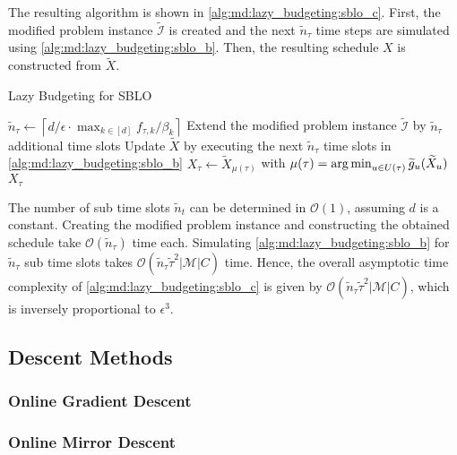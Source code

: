 The resulting algorithm is shown in \autoref{alg:md:lazy_budgeting:sblo_c}. First, the modified problem instance $\widetilde{\mathcal{I}}$ is created and the next $\widetilde{n}_{\tau}$ time steps are simulated using \autoref{alg:md:lazy_budgeting:sblo_b}. Then, the resulting schedule $X$ is constructed from $\widetilde{X}$.

\begin{algorithm}
    \caption{Lazy Budgeting for SBLO \cite{Albers2021_2}}\label{alg:md:lazy_budgeting:sblo_c}
    $\widetilde{n}_{\tau} \gets \left\lceil d / \epsilon \cdot \max_{k \in [d]} f_{\tau,k} / \beta_k\right\rceil$\;
    Extend the modified problem instance $\widetilde{\mathcal{I}}$ by $\widetilde{n}_{\tau}$ additional time slots\;
    Update $\widetilde{X}$ by executing the next $\widetilde{n}_{\tau}$ time slots in \autoref{alg:md:lazy_budgeting:sblo_b}\;
    $X_{\tau} \gets \widetilde{X}_{\mu(\tau)}$ with $\mu(\tau) = \operatorname*{arg\,min}_{u \in U(\tau)} \widetilde{g}_u(\widetilde{X}_u)$\;
    \Return $X_{\tau}$\;
\end{algorithm}

The number of sub time slots $\widetilde{n}_t$ can be determined in $\mathcal{O}(1)$, assuming $d$ is a constant. Creating the modified problem instance and constructing the obtained schedule take $\mathcal{O}(\widetilde{n}_{\tau})$ time each. Simulating \autoref{alg:md:lazy_budgeting:sblo_b} for $\widetilde{n}_{\tau}$ sub time slots takes $\mathcal{O}(\widetilde{n}_{\tau} \widetilde{\tau}^2 |\mathcal{M}| C)$ time. Hence, the overall asymptotic time complexity of \autoref{alg:md:lazy_budgeting:sblo_c} is given by $\mathcal{O}(\widetilde{n}_{\tau} \widetilde{\tau}^2 |\mathcal{M}| C)$, which is inversely proportional to $\epsilon^3$.

\subsection{Descent Methods}\label{section:online_algorithms:md:descent_methods}

\subsubsection{Online Gradient Descent}

\subsubsection{Online Mirror Descent}

